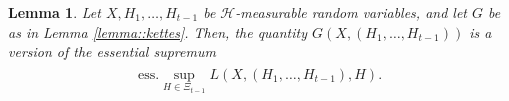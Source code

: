 \documentclass[a4paper]{article}
\newtheorem{lemma}[theorem]{Lemma}
\newcommand{\indicator}[1]{\mathbf{1}_{\{ #1 \}}}
\begin{document}
%

\begin{lemma}\label{lemma::harmas}
Let $X,H_1,\hdots, H_{t-1} $ be $\mathcal{H}$-measurable random variables, and let $G$ be as in Lemma \ref{lemma::kettes}. Then, the quantity $G(X,(H_1,\hdots, H_{t-1}))$ is a version of the essential supremum
\begin{align*}
\begin{split}
\mathrm{ess.}\sup_{H\in \Xi_{t-1}}
L(X,(H_1,\hdots,H_{t-1}), H).
\end{split}
\end{align*}
\end{lemma}
\end{document}
